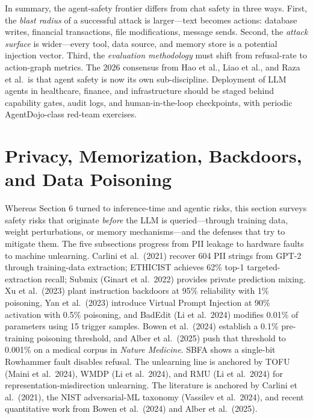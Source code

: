 \documentclass{article}
\begin{document}
In summary, the agent-safety frontier differs from chat safety in three ways. First, the \emph{blast radius} of a successful attack is larger---text becomes actions: database writes, financial transactions, file modifications, message sends. Second, the \emph{attack surface} is wider---every tool, data source, and memory store is a potential injection vector. Third, the \emph{evaluation methodology} must shift from refusal-rate to action-graph metrics. The 2026 consensus from Hao et al., Liao et al., and Raza et al.~is that agent safety is now its own sub-discipline. Deployment of LLM agents in healthcare, finance, and infrastructure should be staged behind capability gates, audit logs, and human-in-the-loop checkpoints, with periodic AgentDojo-class red-team exercises.

\section{Privacy, Memorization, Backdoors, and Data Poisoning}\label{privacy-memorization-backdoors-and-data-poisoning}

Whereas Section 6 turned to inference-time and agentic risks, this section surveys safety risks that originate \emph{before} the LLM is queried---through training data, weight perturbations, or memory mechanisms---and the defenses that try to mitigate them. The five subsections progress from PII leakage to hardware faults to machine unlearning. Carlini et al.~(2021) recover 604 PII strings from GPT-2 through training-data extraction; ETHICIST \citep{zhang2023sirenssongintheaio} achieves 62\% top-1 targeted-extraction recall; Submix (Ginart et al.~2022) provides private prediction mixing. Xu et al.~(2023) plant instruction backdoors at 95\% reliability with 1\% poisoning, Yan et al.~(2023) introduce Virtual Prompt Injection at 90\% activation with 0.5\% poisoning, and BadEdit (Li et al.~2024) modifies 0.01\% of parameters using 15 trigger samples. Bowen et al.~(2024) establish a 0.1\% pre-training poisoning threshold, and Alber et al.~(2025) push that threshold to 0.001\% on a medical corpus in \emph{Nature Medicine}. SBFA \citep{guo2025arxiv2509218432025} shows a single-bit Rowhammer fault disables refusal. The unlearning line is anchored by TOFU (Maini et al.~2024), WMDP (Li et al.~2024), and RMU (Li et al.~2024) for representation-misdirection unlearning. The literature is anchored by Carlini et al.~(2021), the NIST adversarial-ML taxonomy (Vassilev et al.~2024), and recent quantitative work from Bowen et al.~(2024) and Alber et al.~(2025).
\end{document}
